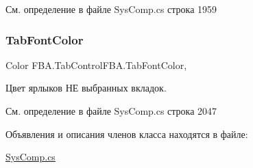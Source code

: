 См. определение в файле Sys\+Comp.\+cs строка 1959

\mbox{\label{class_f_b_a_1_1_tab_control_f_b_a_aeab8d61d5db0da9fe4c5d942145d425a}} 
\subsubsection{\texorpdfstring{Tab\+Font\+Color}{TabFontColor}}
{\footnotesize\ttfamily Color F\+B\+A.\+Tab\+Control\+F\+B\+A.\+Tab\+Font\+Color\hspace{0.3cm}{\ttfamily [get]}, {\ttfamily [set]}}



Цвет ярлыков НЕ выбранных вкладок. 



См. определение в файле Sys\+Comp.\+cs строка 2047



Объявления и описания членов класса находятся в файле\+:\begin{DoxyCompactItemize}
\item 
\mbox{\hyperlink{_sys_comp_8cs}{Sys\+Comp.\+cs}}\end{DoxyCompactItemize}
